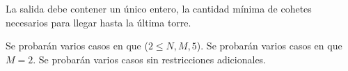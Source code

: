 \documentclass{oci}
\begin{document}
\begin{outputDescription}
  La salida debe contener un único entero, la cantidad mínima de cohetes necesarios para llegar hasta la última torre.
\end{outputDescription}

\begin{scoreDescription}
  Se probarán varios casos en que ($2 \leq N, M, 5$).
  Se probarán varios casos en que $M=2$.
  Se probarán varios casos sin restricciones adicionales.
\end{scoreDescription}

\begin{sampleDescription}
\end{sampleDescription}
\end{document}
